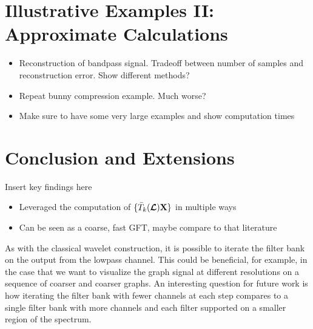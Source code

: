 \documentclass[journal, 10pt]{IEEEtran}
\begin{document}
{\color{blue}
\section{Illustrative Examples II: Approximate Calculations} \label{Se:ill2}
\begin{itemize}
\item Reconstruction of bandpass signal. Tradeoff between number of samples and reconstruction error. Show different methods? 
\item Repeat bunny compression example. Much worse?
\item Make sure to have some very large examples and show computation times
\end{itemize}
}


\section{Conclusion and Extensions}
\label{Sec:ongoing}
{\color{red} %

Insert key findings here
\begin{itemize}
\item Leveraged the computation of $\{\bar{T}_k(\boldsymbol{\mathcal{L}}){\bf X}\}$ in multiple ways 
\item Can be seen as a coarse, fast GFT, maybe compare to that literature
\end{itemize}
}

As with the classical wavelet construction, it is possible to iterate the filter bank on the output from the lowpass channel.
This could be beneficial, for example, in the case that we want to visualize the graph signal at different resolutions on  a sequence of coarser and coarser graphs. An interesting question for future work is how iterating the filter bank with fewer channels at each step compares to a single filter bank with more channels and each filter supported on a smaller region of the spectrum.


\balance

{\small }
\end{document}

